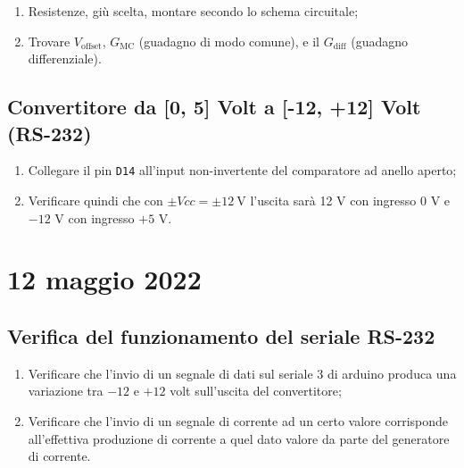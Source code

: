 \documentclass[fleqn,varvw,preprintnumbers,citeautoscript]{memo}
\begin{document}
\begin{enumerate}
    \item Resistenze, giù scelta, montare secondo lo schema circuitale;
    \item Trovare $V_\text{offset}$, $G_\text{MC}$ (guadagno di modo comune), e il $G_\text{diff}$ (guadagno differenziale). 
\end{enumerate}

\subsection{Convertitore da [0, 5] Volt a [-12, +12] Volt (RS-232)}

\begin{enumerate}
    \item Collegare il pin \verb-D14- all'input non-invertente del comparatore ad anello aperto;
    \item Verificare quindi che con $\pm Vcc = \pm\SI{12}{\volt}$ l'uscita sarà 12 V con ingresso 0 V e $-12$ V con ingresso $+5$ V.
\end{enumerate}

\section{12 maggio 2022}

\subsection{Verifica del funzionamento del seriale RS-232} 
\begin{enumerate}
    \item Verificare che l'invio di un segnale di dati sul seriale 3 di arduino produca una variazione tra $-12$ e $+12$ volt sull'uscita del convertitore;
    \item Verificare che l'invio di un segnale di corrente ad un certo valore corrisponde all'effettiva produzione di corrente a quel dato valore da parte del generatore di corrente.
\end{enumerate}
\end{document}
